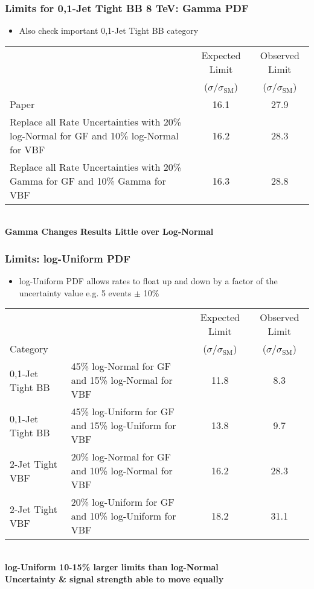 \documentclass{beamer}
\begin{document}
\begin{frame}
\frametitle{Limits for 0,1-Jet Tight BB 8 TeV: Gamma PDF}
\begin{itemize}
  \item Also check important 0,1-Jet Tight BB category
\end{itemize}
\begin{center}
\scriptsize
\begin{tabular}{ | p{5cm} | c | c | }
\hline
 & Expected Limit  & Observed Limit\\
 & ($\sigma/\sigma_\mathrm{SM}$) & ($\sigma/\sigma_\mathrm{SM}$) \\ \hline \hline
Paper & 16.1 & 27.9 \\ \hline
Replace all Rate Uncertainties with 20\% log-Normal for GF and 10\% log-Normal for VBF & 16.2 & 28.3 \\ \hline
Replace all Rate Uncertainties with 20\% Gamma for GF and 10\% Gamma for VBF & 16.3 & 28.8 \\ \hline
\end{tabular}
\\ \normalsize
\vspace{1ex}
\bf Gamma Changes Results Little over Log-Normal
\end{center}
\end{frame}

\begin{frame}
\frametitle{Limits: log-Uniform PDF}
\begin{itemize}
  \item log-Uniform PDF allows rates to float up and down by a factor of the uncertainty value e.g. 5 events $\pm$ 10\%
\end{itemize}
\begin{center}
\scriptsize
\begin{tabular}{ | l | p{4cm} | c | c | }
\hline
& & Expected Limit  & Observed Limit\\
Category & & ($\sigma/\sigma_\mathrm{SM}$) & ($\sigma/\sigma_\mathrm{SM}$) \\ \hline \hline
0,1-Jet Tight BB& 45\% log-Normal for GF and 15\% log-Normal for VBF & 11.8 & 8.3 \\ \hline
0,1-Jet Tight BB& 45\% log-Uniform for GF and 15\% log-Uniform for VBF & 13.8 & 9.7 \\ \hline
\hline
2-Jet Tight VBF& 20\% log-Normal for GF and 10\% log-Normal for VBF & 16.2 & 28.3 \\ \hline
2-Jet Tight VBF& 20\% log-Uniform for GF and 10\% log-Uniform for VBF & 18.2 & 31.1 \\ \hline
\end{tabular}
\\ \normalsize
\vspace{1ex}
\bf log-Uniform 10-15\% larger limits than log-Normal \\
Uncertainty \& signal strength able to move equally
\end{center}
\end{frame}
\end{document}
